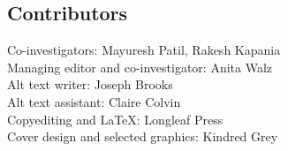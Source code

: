\documentclass{AeroStructure-ERJohnson}
\begin{document}
\vspace*{20pt}

\subsection*{Contributors}

\vspace*{6pt}

Co-investigators: Mayuresh Patil, Rakesh Kapania\\
Managing editor and co-investigator: Anita Walz\\
Alt text writer: Joseph Brooks \\
Alt text assistant: Claire Colvin\\
Copyediting and LaTeX: Longleaf Press\\
Cover design and selected graphics: Kindred Grey

\clearemptydoublepage

\stop
\end{document}
